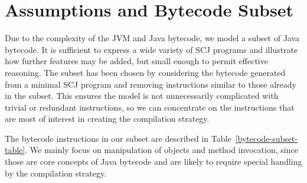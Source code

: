 \documentclass[a4paper,10pt]{report}
\begin{document}
\section{Assumptions and Bytecode Subset}
\label{cee-assumptions-section}

Due to the complexity of the JVM and Java bytecode, we model a subset
of Java bytecode.
It is sufficient to express a wide variety of SCJ programs and
illustrate how further features may be added, but small enough to
permit effective reasoning.
The subset has been chosen by considering the bytecode generated from
a minimal SCJ program and removing instructions similar to those
already in the subset.
This ensures the model is not unnecessarily complicated with trivial
or redundant instructions, so we can concentrate on the instructions
that are most of interest in creating the compilation strategy.

The bytecode instructions in our subset are described in
Table~\ref{bytecode-subset-table}.
We mainly focus on manipulation of objects and method invocation,
since those are core concepts of Java bytecode and are likely to
require special handling by the compilation strategy.
\end{document}
